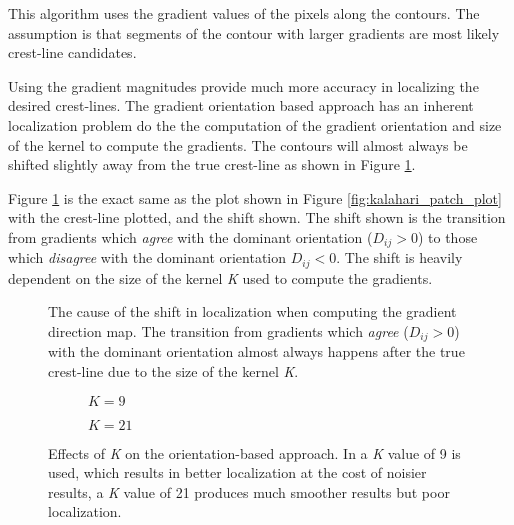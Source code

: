 This algorithm uses the gradient values of the pixels along the contours. The assumption is that segments of the contour with larger gradients are most likely crest-line candidates. 

Using the gradient magnitudes provide much more accuracy in localizing the desired crest-lines. The gradient orientation based approach has an inherent localization problem do the the computation of the gradient orientation and size of the kernel to compute the gradients. The contours will almost always be shifted slightly away from the true crest-line as shown in Figure \ref{fig:orientation_transition_shift}.

Figure \ref{fig:orientation_transition_shift} is the exact same as the plot shown in Figure \ref{fig:kalahari_patch_plot} with the crest-line plotted, and the shift shown. The shift shown is the transition from gradients which \emph{agree} with the dominant orientation ($D_{ij} > 0$) to those which \emph{disagree} with the dominant orientation {$D_{ij} < 0$}. The shift is heavily dependent on the size of the kernel \emph{K} used to compute the gradients.

\begin{figure}
	\centering
	\caption{The cause of the shift in localization when computing the gradient direction map. The transition from gradients which \emph{agree} ($D_{ij} > 0$) with the dominant orientation almost always happens after the true crest-line due to the size of the kernel \emph{K}.}
	\label{fig:orientation_transition_shift}
\end{figure}

\begin{figure}
	\centering
	\begin{subfigure}{0.48\textwidth}
		\centering
		\caption{$K=9$}
		\label{fig:shift_k_9}
	\end{subfigure}
	\begin{subfigure}{0.48\textwidth}
		\centering
		\caption{$K=21$}
		\label{fig:shift_k_21}
	\end{subfigure}
	\caption{Effects of \emph{K} on the orientation-based approach. In  a \emph{K} value of 9 is used, which results in better localization at the cost of noisier results,  a \emph{K} value of 21 produces much smoother results but poor localization. }
	\label{fig:effect_k}
\end{figure}

